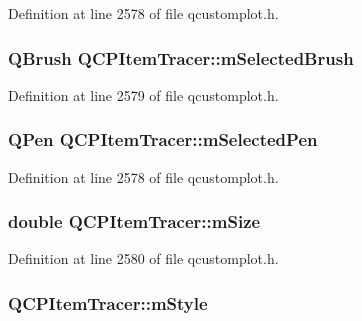 Definition at line 2578 of file qcustomplot.\-h.

\hypertarget{class_q_c_p_item_tracer_a1c15d2adde40efdcc0ef1ff78fd256a6}{
\subsubsection[{m\-Selected\-Brush}]{\setlength{\rightskip}{0pt plus 5cm}Q\-Brush Q\-C\-P\-Item\-Tracer\-::m\-Selected\-Brush\hspace{0.3cm}{\ttfamily [protected]}}}\label{class_q_c_p_item_tracer_a1c15d2adde40efdcc0ef1ff78fd256a6}


Definition at line 2579 of file qcustomplot.\-h.

\hypertarget{class_q_c_p_item_tracer_a3f61829784200819661d1e2a5354d866}{
\subsubsection[{m\-Selected\-Pen}]{\setlength{\rightskip}{0pt plus 5cm}Q\-Pen Q\-C\-P\-Item\-Tracer\-::m\-Selected\-Pen\hspace{0.3cm}{\ttfamily [protected]}}}\label{class_q_c_p_item_tracer_a3f61829784200819661d1e2a5354d866}


Definition at line 2578 of file qcustomplot.\-h.

\hypertarget{class_q_c_p_item_tracer_a575153a24bb357d1e006f6bc3bd099b9}{
\subsubsection[{m\-Size}]{\setlength{\rightskip}{0pt plus 5cm}double Q\-C\-P\-Item\-Tracer\-::m\-Size\hspace{0.3cm}{\ttfamily [protected]}}}\label{class_q_c_p_item_tracer_a575153a24bb357d1e006f6bc3bd099b9}


Definition at line 2580 of file qcustomplot.\-h.

\hypertarget{class_q_c_p_item_tracer_afb1f236bebf417544e0138fef22a292e}{
\subsubsection[{m\-Style}]{ Q\-C\-P\-Item\-Tracer\-::m\-Style\hspace{0.3cm}{\ttfamily [protected]}}}\label{class_q_c_p_item_tracer_afb1f236bebf417544e0138fef22a292e}


